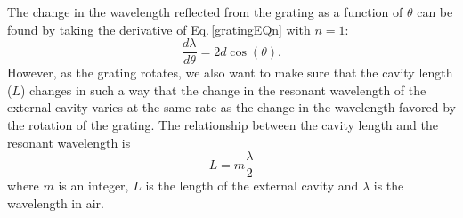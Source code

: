 The change in the wavelength reflected from the grating as a function of $\theta$ can be found by taking the derivative of Eq.\,\ref{gratingEQn} with $n=1$:
\begin{equation}
    \frac{d\lambda}{d \theta}= 2d \cos(\theta).
\end{equation}
However, as the grating rotates, we also want to make sure that the cavity length ($L$) changes in such a way that the change in the resonant wavelength of the external cavity varies at the same rate as the change in the wavelength favored by the rotation of the grating. The relationship between the cavity length and the resonant wavelength is 
\begin{equation}
L=m\frac{\lambda}{2}
\end{equation}
where $m$ is an integer, $L$ is the length of the external cavity and $\lambda$ is the wavelength in air.


